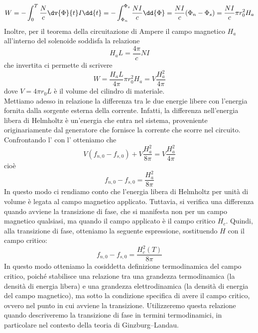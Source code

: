 \begin{equation*}
   W
   =-\int_{0}^{T} \frac{N}{c} \dv{\Phi}{t} I \dd{t}
   =-\int_{\Phi_n}^{\Phi_s} \frac{N I}{c} \dd{\Phi}
   =\frac{N I}{c} ( \Phi_n - \Phi_s )
   =\frac{N I}{c} \pi r_0^2 H_a
\end{equation*}
Inoltre, per il teorema della circuitazione di Ampere il campo magnetico $H_a$ all'interno del solenoide soddisfa la relazione
\begin{equation*}
   H_a L
   =\frac{4\pi}{c} N I
\end{equation*}
che invertita ci permette di scrivere
\begin{equation}
   W
   =\frac{H_a L}{4\pi} \pi r_0^2 H_a
   =V \frac{H_a^2}{4\pi}
   \label{eq:energia_associata}
\end{equation}
dove $V=4 \pi r_0 L$ è il volume del cilindro di materiale.\\
Mettiamo adesso in relazione la differenza tra le due energie libere con l'energia fornita dalla sorgente esterna della corrente. Infatti, la differenza nell'energia libera di Helmholtz è un'energia che entra nel sistema, proveniente originariamente dal generatore che fornisce la corrente che scorre nel circuito. Confrontando l' con l' otteniamo che
\begin{equation*}
   V ( f_{n,0} - f_{s,0} ) + V \frac{H_a^2}{8\pi}
   =V \frac{H_a^2}{4\pi}
\end{equation*}
cioè
\begin{equation*}
   f_{n,0} - f_{s,0}
   =\frac{H_a^2}{8\pi}
\end{equation*}
In questo modo ci rendiamo conto che l'energia libera di Helmholtz per unità di volume è legata al campo magnetico applicato. Tuttavia, si verifica una differenza quando avviene la transizione di fase, che si manifesta non per un campo magnetico qualsiasi, ma quando il campo applicato è il campo critico $H_c$. Quindi, alla transizione di fase, otteniamo la seguente espressione, sostituendo $H$ con il campo critico:
\begin{equation}
   f_{n,0} - f_{s,0} = \frac{H_c^2(T)}{8\pi}
   \label{eq:relazione_termodinamica_campo_critico}
\end{equation}
In questo modo otteniamo la cosiddetta definizione termodinamica del campo critico, poiché stabilisce una relazione tra una grandezza termodinamica (la densità di energia libera) e una grandezza elettrodinamica (la densità di energia del campo magnetico), ma sotto la condizione specifica di avere il campo critico, ovvero nel punto in cui avviene la transizione. Utilizzeremo questa relazione quando descriveremo la transizione di fase in termini termodinamici, in particolare nel contesto della teoria di Ginzburg--Landau.\\

